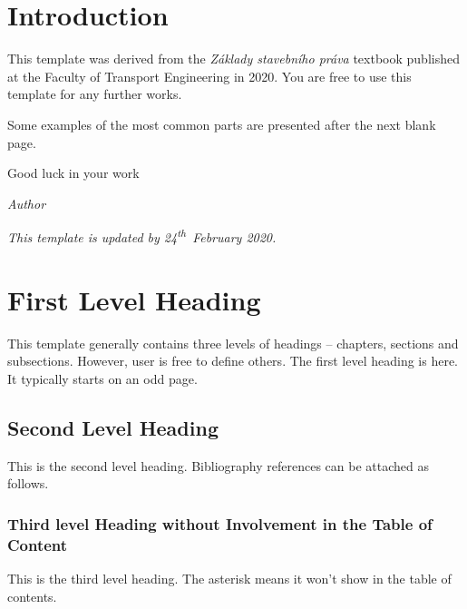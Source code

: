 \documentclass[11pt,b5paper,twoside]{report}										%
\begin{document}
\newpage																			%
\listoftables																		%

% 
%

\chapter*{Introduction}

This template was derived from the \textit{Základy stavebního práva} textbook published at the Faculty of Transport Engineering in 2020. You are free to use this template for any further works.

Some examples of the most common parts are presented after the next blank page.

Good luck in your work

\begin{flushright}
	\textit{Author}
\end{flushright}

\vspace{1 cm}
\textit{This template is updated by 24\textsuperscript{th}~February 2020.}

\afterpage{\null\newpage}												%

\chapter{First Level Heading}
\label{cha:flh}

This template generally contains three levels of headings -- chapters, sections and subsections. However, user is free to define others. The first level heading is here. It typically starts on an odd page.

\section{Second Level Heading}
\label{sec:slh}

This is the second level heading. Bibliography references can be attached as follows. \cite{enb1,osn1,kli1}

\subsection*{Third level Heading without Involvement in the Table of Content}
This is the third level heading. The asterisk means it won't show in the table of contents.
\end{document}
